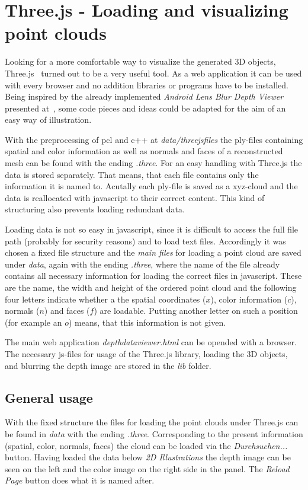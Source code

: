 \documentclass[paper=a4,11pt,bibliography=totoc]{scrartcl}
\begin{document}
\section{Three.js - Loading and visualizing point clouds}
%
Looking for a more comfortable way to visualize the generated 3D objects, Three.js~\cite{three} turned out to be a very useful tool. As a web application it can be used with every browser and no addition libraries or programs have to be installed. Being inspired by the already implemented \textit{Android Lens Blur Depth Viewer} presented at~\cite{depthplayer}, some code pieces and ideas could be adapted for the aim of an easy way of illustration.

With the preprocessing of pcl and c++ at \textit{data/threejsfiles} the ply-files containing spatial and color information as well as normals and faces of a reconstructed mesh can be found with the ending \textit{.three}. For an easy handling with Three.js the data is stored separately. That means, that each file contains only the information it is named to. Acutally each ply-file is saved as a xyz-cloud and the data is reallocated with javascript to their correct content. This kind of structuring also prevents loading redundant data.

Loading data is not so easy in javascript, since it is difficult to access the full file path (probably for security reasons) and to load text files. Accordingly it was chosen a fixed file structure and the \textit{main files} for loading a point cloud are saved under \textit{data}, again with the ending \textit{.three}, where the name of the file already contains all necessary information for loading the correct files in javascript. These are the name, the width and height of the ordered point cloud and the following four letters indicate whether a the spatial coordinates ($x$), color information ($c$), normals ($n$) and faces ($f$) are loadable. Putting another letter on such a position (for example an $o$) means, that this information is not given. 

The main web application \textit{depthdataviewer.html} can be opended with a browser. The necessary js-files for usage of the Three.js library, loading the 3D objects, and blurring the depth image are stored in the \textit{lib} folder.
%
\subsection{General usage}
%
With the fixed structure the files for loading the point clouds under Three.js can be found in \textit{data} with the ending \textit{.three}. Corresponding to the present information (spatial, color, normals, faces) the cloud can be loaded via the \textit{Durchsuchen...} button. Having loaded the data below \textit{2D Illustrations} the depth image can be seen on the left and the color image on the right side in the panel. The \textit{Reload Page} button does what it is named after.
\end{document}

